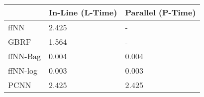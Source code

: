 \begin{tabular}{lll}
\toprule
{} & In-Line (L-Time) & Parallel (P-Time) \\
\midrule
ffNN     &            2.425 &                 - \\
GBRF     &            1.564 &                 - \\
ffNN-Bag &            0.004 &             0.004 \\
ffNN-log &            0.003 &             0.003 \\
PCNN     &            2.425 &             2.425 \\
\bottomrule
\end{tabular}
